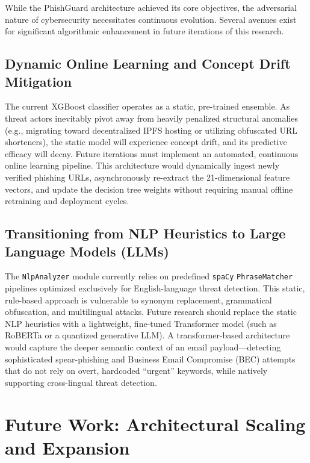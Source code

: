 While the PhishGuard architecture achieved its core objectives, the
adversarial nature of cybersecurity necessitates continuous evolution.
Several avenues exist for significant algorithmic enhancement in future
iterations of this research.

\subsection{Dynamic Online Learning and Concept Drift
Mitigation}\label{dynamic-online-learning-and-concept-drift-mitigation}

The current XGBoost classifier operates as a static, pre-trained
ensemble. As threat actors inevitably pivot away from heavily penalized
structural anomalies (e.g., migrating toward decentralized IPFS hosting
or utilizing obfuscated URL shorteners), the static model will
experience concept drift, and its predictive efficacy will decay. Future
iterations must implement an automated, continuous online learning
pipeline. This architecture would dynamically ingest newly verified
phishing URLs, asynchronously re-extract the 21-dimensional feature
vectors, and update the decision tree weights without requiring manual
offline retraining and deployment cycles.

\subsection{Transitioning from NLP Heuristics to Large Language
Models
(LLMs)}\label{transitioning-from-nlp-heuristics-to-large-language-models-llms}

The \texttt{NlpAnalyzer} module currently relies on predefined
\texttt{spaCy} \texttt{PhraseMatcher} pipelines optimized exclusively
for English-language threat detection. This static, rule-based approach
is vulnerable to synonym replacement, grammatical obfuscation, and
multilingual attacks. Future research should replace the static NLP
heuristics with a lightweight, fine-tuned Transformer model (such as
RoBERTa or a quantized generative LLM). A transformer-based architecture
would capture the deeper semantic context of an email
payload---detecting sophisticated spear-phishing and Business Email
Compromise (BEC) attempts that do not rely on overt, hardcoded
``urgent'' keywords, while natively supporting cross-lingual threat
detection.

\section{Future Work: Architectural Scaling and
Expansion}\label{future-work-architectural-scaling-and-expansion}

